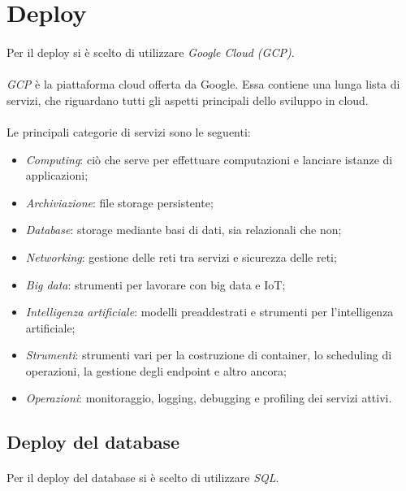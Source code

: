 \documentclass[11pt,a4paper,english]{article}
\begin{document}
\newpage
\section{Deploy}

\paragraph{} Per il deploy si è scelto di utilizzare \emph{Google Cloud (GCP)}. 

\paragraph{} \emph{GCP} \cite{gcp} è la piattaforma cloud offerta da Google. Essa contiene una lunga lista di servizi, che riguardano tutti gli aspetti principali dello sviluppo in cloud.  

\paragraph{} Le principali categorie di servizi sono le seguenti:
\begin{itemize}
    \item \emph{Computing}: ciò che serve per effettuare computazioni e lanciare istanze di applicazioni;
    \item \emph{Archiviazione}: file storage persistente;
    \item \emph{Database}: storage mediante basi di dati, sia relazionali che non;
    \item \emph{Networking}: gestione delle reti tra servizi e sicurezza delle reti;
    \item \emph{Big data}: strumenti per lavorare con big data e IoT;
    \item \emph{Intelligenza artificiale}: modelli preaddestrati e strumenti per l'intelligenza artificiale;
    \item \emph{Strumenti}: strumenti vari per la costruzione di container, lo scheduling di operazioni, la gestione degli endpoint e altro ancora;
    \item \emph{Operazioni}: monitoraggio, logging, debugging e profiling dei servizi attivi.
\end{itemize}

\subsection{Deploy del database}

\paragraph{} Per il deploy del database si è scelto di utilizzare \emph{SQL}. 
\end{document}
